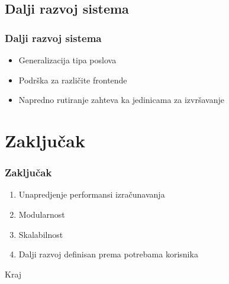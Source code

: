 \documentclass[11pt]{beamer}
\begin{document}

\subsection{Dalji razvoj sistema}

\begin{frame}
	\frametitle{Dalji razvoj sistema}
	
	\begin{itemize}
		\item Generalizacija tipa poslova
		\item Podrška za različite frontende
		\item Napredno rutiranje zahteva ka jedinicama za izvršavanje
	\end{itemize}

\end{frame}


\section{Zaključak}

\begin{frame}
	\frametitle{Zaključak}
	
	\begin{enumerate}
		\item Unapredjenje performansi izračunavanja
		\item Modularnost
		\item Skalabilnost
		\item Dalji razvoj definisan prema potrebama korisnika
	\end{enumerate}

\end{frame}


\begin{frame}[plain]
	\begin{center}
		{\Huge Kraj}
	\end{center}
\end{frame}

\end{document}
